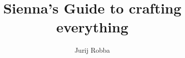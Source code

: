 \documentclass[12pt,a4paper]{report}
\begin{document}
\begin{titlepage}

\title{Sienna's Guide to crafting everything}
\author{Jurij Robba}

\maketitle

\end{titlepage}



\tableofcontents

























\end{document}
